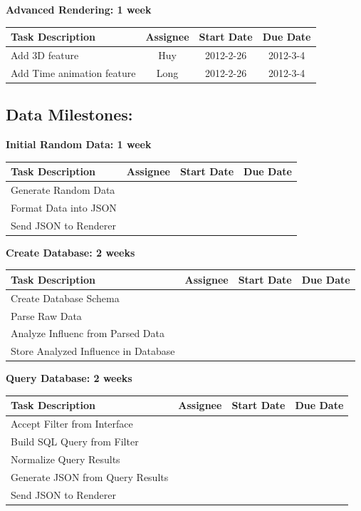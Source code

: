 \documentclass[12pt, letterpaper]{article}
\begin{document}
  \begin{center}
		{\bf Advanced Rendering: 1 week}
    \begin{tabular}{|p{8.3cm} || c | c | c | }
      \hline
      Task Description & Assignee & Start Date & Due Date \\
      \hline
	    Add 3D feature & Huy & 2012-2-26 & 2012-3-4 \\
	    Add Time animation feature & Long & 2012-2-26 & 2012-3-4 \\
      \hline
    \end{tabular}
  \end{center}


\subsection{Data Milestones:}

  \begin{center}
		{\bf Initial Random Data: 1 week}
    \begin{tabular}{| p{8.3cm} || c | c | c | }
      \hline
      Task Description & Assignee & Start Date & Due Date \\
      \hline
	    Generate Random Data& & & \\
	    Format Data into JSON& & & \\
	    Send JSON to Renderer& & & \\
      \hline
    \end{tabular}
  \end{center}

  \begin{center}
		{\bf Create Database: 2 weeks}
    \begin{tabular}{| p{8.3cm} || c | c | c | }
      \hline
      Task Description & Assignee & Start Date & Due Date \\
      \hline
	    Create Database Schema& & & \\
	    Parse Raw Data& & & \\
	    Analyze Influenc from Parsed Data& & & \\
	    Store Analyzed Influence in Database& & & \\
      \hline
    \end{tabular}
  \end{center}

  \begin{center}
		{\bf Query Database: 2 weeks}
    \begin{tabular}{| p{8.3cm} || c | c | c | }
      \hline
      Task Description & Assignee & Start Date & Due Date \\
      \hline
	    Accept Filter from Interface& & & \\
	    Build SQL Query from Filter& & & \\
        Normalize Query Results& & & \\
	    Generate JSON from Query Results& & & \\
	    Send JSON to Renderer& & & \\
      \hline
    \end{tabular}
  \end{center}
\end{document}
